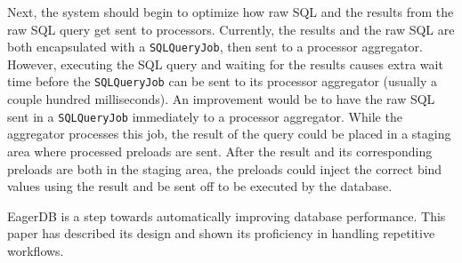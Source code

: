 \documentclass[12pt]{article}
\begin{document}
Next, the system should begin to optimize how raw SQL and the results from the raw SQL query get sent to processors. Currently, the results and the raw SQL are both encapsulated with a \texttt{SQLQueryJob}, then sent to a processor aggregator. However, executing the SQL query and waiting for the results causes extra wait time before the \texttt{SQLQueryJob} can be sent to its processor aggregator (usually a couple hundred milliseconds). An improvement would be to have the raw SQL sent in a \texttt{SQLQueryJob} immediately to a processor aggregator. While the aggregator processes this job, the result of the query could be placed in a staging area where processed preloads are sent. After the result and its corresponding preloads are both in the staging area, the preloads could inject the correct bind values using the result and be sent off to be executed by the database.

EagerDB is a step towards automatically improving database performance. This paper has described its design and shown its proficiency in handling repetitive workflows.
\end{document}
